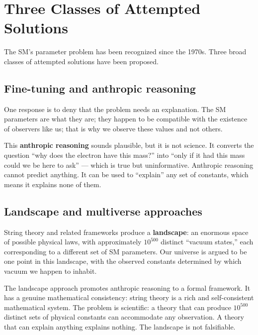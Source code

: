 \documentclass[11pt,a4paper]{article}
\newcommand{\term}[1]{\textbf{#1}}
\begin{document}
\section{Three Classes of Attempted Solutions}
\label{sec:solutions}

The SM's parameter problem has been recognized since the 1970s.
Three broad classes of attempted solutions have been proposed.

\subsection{Fine-tuning and anthropic reasoning}

One response is to deny that the problem needs an explanation.
The SM parameters are what they are; they happen to be compatible with the
existence of observers like us; that is why we observe these values and not others.

This \term{anthropic reasoning} sounds plausible, but it is not science.
It converts the question ``why does the electron have this mass?'' into
``only if it had this mass could we be here to ask'' --- which is true but
uninformative.
Anthropic reasoning cannot predict anything.
It can be used to ``explain'' any set of constants, which means it explains none of them.

\subsection{Landscape and multiverse approaches}

String theory and related frameworks produce a \term{landscape}: an enormous
space of possible physical laws, with approximately $10^{500}$ distinct
``vacuum states,'' each corresponding to a different set of SM parameters.
Our universe is argued to be one point in this landscape, with the observed
constants determined by which vacuum we happen to inhabit.

The landscape approach promotes anthropic reasoning to a formal framework.
It has a genuine mathematical consistency: string theory is a rich and
self-consistent mathematical system.
The problem is scientific: a theory that can produce $10^{500}$ distinct
sets of physical constants can accommodate any observation.
A theory that can explain anything explains nothing.
The landscape is not falsifiable.
\end{document}
